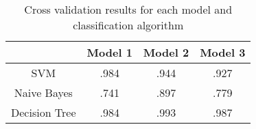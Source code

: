 \begin{center}
\begin{table}
\begin{tabular}{c|ccc}
&\textbf{Model 1} & \textbf{Model 2} &\textbf{Model 3}\\
\hline
SVM & .984 & .944 & .927\\
Naive Bayes & .741 & .897 & .779\\
Decision Tree & .984 & .993 & .987
\end{tabular}
\caption{Cross validation results for each model and classification algorithm}
\label{table:allcv}
\end{table}
\end{center}

